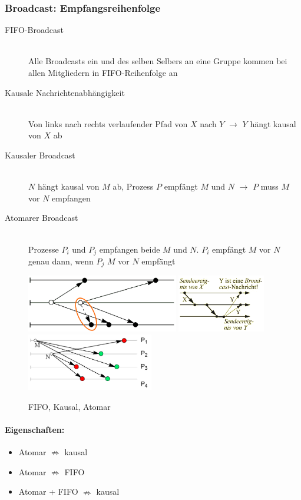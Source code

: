 \documentclass[10pt,a4paper]{article}
\begin{document}
\subsubsection{Broadcast: Empfangsreihenfolge}
\begin{description}
\item[FIFO-Broadcast]\hfill\\
Alle Broadcasts ein und des selben Selbers an eine Gruppe kommen bei allen Mitgliedern in FIFO-Reihenfolge an
\item[Kausale Nachrichtenabhängigkeit]\hfill\\
Von links nach rechts verlaufender Pfad von $X$ nach $Y$ $\rightarrow$ $Y$ hängt kausal von $X$ ab
\item[Kausaler Broadcast]\hfill\\
$N$ hängt kausal von $M$ ab, Prozess $P$ empfängt $M$ und $N$ $\rightarrow$ $P$ muss $M$ vor $N$ empfangen
\item[Atomarer Broadcast]\hfill\\
Prozesse $P_i$ und $P_j$ empfangen beide $M$ und $N$. $P_i$ empfängt $M$ vor $N$ genau dann, wenn $P_j$ $M$ vor $N$ empfängt
\end{description}

\begin{figure}[h]
\includegraphics[height=2.5cm]{./Bilder/FIFO_Broadcast}
\includegraphics[height=2.5cm]{./Bilder/Kausaler_Broadcast}
\includegraphics[height=2.5cm]{./Bilder/Atomarer_Broadcast}
\caption{FIFO, Kausal, Atomar}
\end{figure}

\paragraph{Eigenschaften:}
\begin{itemize}[topsep=-100ex]
\item Atomar $\nRightarrow$ kausal
\item Atomar $\nRightarrow$ FIFO
\item Atomar + FIFO $\nRightarrow$ kausal
\end{itemize}
\end{document}
